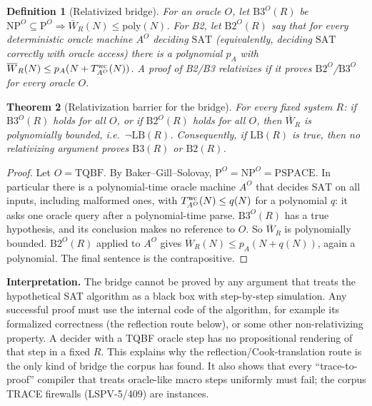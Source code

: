 \documentclass[11pt]{article}
\newtheorem{theorem}{Theorem}
\newtheorem{definition}[theorem]{Definition}
\newcommand{\Wb}{\overline W}
\begin{document}
\begin{definition}[Relativized bridge]
For an oracle $O$, let $\mathrm{B3}^O(R)$ be $\mathrm{NP}^O\subseteq\mathrm P^O\Rightarrow \Wb_R(N)\le\mathrm{poly}(N)$. For B2, let $\mathrm{B2}^O(R)$ say that for every deterministic oracle machine $A^O$ deciding $\mathrm{SAT}$ (equivalently, deciding $\mathrm{SAT}$ correctly with oracle access) there is a polynomial $p_A$ with $\Wb_R(N)\le p_A(N+T^{\rm wc}_{A^O}(N))$. A proof of B2/B3 \emph{relativizes} if it proves $\mathrm{B2}^O$/$\mathrm{B3}^O$ for every oracle $O$.
\end{definition}

\begin{theorem}[Relativization barrier for the bridge]\label{thm:rel}
For every fixed system $R$: if $\mathrm{B3}^O(R)$ holds for all $O$, or if $\mathrm{B2}^O(R)$ holds for all $O$, then $\Wb_R$ is polynomially bounded, i.e.\ $\neg\mathrm{LB}(R)$. Consequently, if $\mathrm{LB}(R)$ is true, then no relativizing argument proves $\mathrm{B3}(R)$ or $\mathrm{B2}(R)$.
\end{theorem}
\begin{proof}
Let $O=\mathrm{TQBF}$. By Baker--Gill--Solovay, $\mathrm P^O=\mathrm{NP}^O=\mathrm{PSPACE}$. In particular there is a polynomial-time oracle machine $A^O$ that decides $\mathrm{SAT}$ on all inputs, including malformed ones, with $T^{\rm wc}_{A^O}(N)\le q(N)$ for a polynomial $q$: it asks one oracle query after a polynomial-time parse. $\mathrm{B3}^O(R)$ has a true hypothesis, and its conclusion makes no reference to $O$. So $\Wb_R$ is polynomially bounded. $\mathrm{B2}^O(R)$ applied to $A^O$ gives $\Wb_R(N)\le p_A(N+q(N))$, again a polynomial. The final sentence is the contrapositive.
\end{proof}

\noindent\textbf{Interpretation.} The bridge cannot be proved by any argument that treats the hypothetical SAT algorithm as a black box with step-by-step simulation. Any successful proof must use the internal code of the algorithm, for example its formalized correctness (the reflection route below), or some other non-relativizing property. A decider with a TQBF oracle step has no propositional rendering of that step in a fixed $R$. This explains why the reflection/Cook-translation route is the only kind of bridge the corpus has found. It also shows that every ``trace-to-proof'' compiler that treats oracle-like macro steps uniformly must fail; the corpus TRACE firewalls (LSPV-5/409) are instances.
\end{document}

